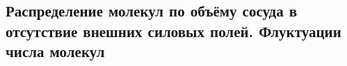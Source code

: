 \subsection{Распределение молекул по объёму сосуда в отсутствие внешних силовых полей. Флуктуации числа молекул}